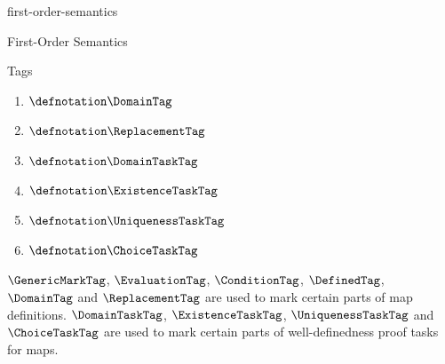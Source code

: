 \documentclass{stex}
\begin{document}
\begin{smodule}{first-order-semantics}
\begin{sfragment}[id=sec:first-order-semantics]{First-Order Semantics}
\begin{sfragment}[id=sec:tags]{Tags}
\begin{sparagraph}
\begin{enumerate}
        \item $\defnotation\DomainTag$
        \item $\defnotation\ReplacementTag$
        \item $\defnotation\DomainTaskTag$
        \item $\defnotation\ExistenceTaskTag$
        \item $\defnotation\UniquenessTaskTag$
        \item $\defnotation\ChoiceTaskTag$
      \end{enumerate}
    \end{sparagraph}

    $\GenericMarkTag$, $\EvaluationTag$, $\ConditionTag$, $\DefinedTag$, $\DomainTag$ and $\ReplacementTag$ 
    are used to mark certain parts of map definitions.
    $\DomainTaskTag$, $\ExistenceTaskTag$, $\UniquenessTaskTag$ and $\ChoiceTaskTag$  are used to mark
    certain parts of well-definedness proof tasks for maps.
  \end{sfragment}


\end{sfragment}
\end{smodule}
\end{document}
